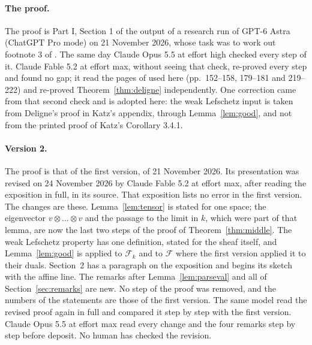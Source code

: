 \documentclass[11pt,a4paper]{article}
\theoremstyle{plain}
\theoremstyle{remark}
\newcommand{\F}{\mathcal F}
\begin{document}
\paragraph{The proof.}
The proof is Part I, Section 1 of the output of a research run of GPT-6 Astra (ChatGPT Pro mode) on 21 November 2026,
whose task was to work out footnote 3 of \cite{Alpoge}. The same day Claude Opus 5.5 at effort high checked every
step of it. Claude Fable 5.2 at effort max, without seeing that check, re-proved every step and found no gap; it read
the pages of \cite{KatzACT} used here (pp.~152--158, 179--181 and 219--222) and re-proved
Theorem~\ref{thm:deligne} independently. One correction came from that second check and is adopted here: the weak
Lefschetz input is taken from Deligne's proof in Katz's appendix, through Lemma~\ref{lem:good}, and not from the
printed proof of Katz's Corollary 3.4.1.

\paragraph{Version 2.}
The proof is that of the first version, of 21 November 2026. Its presentation was revised on 24 November 2026 by
Claude Fable 5.2 at effort max, after reading the exposition \cite{Zhang} in full, in its source. That exposition
lists no error in the first version. The changes are these. Lemma~\ref{lem:tensor} is stated for one space; the
eigenvector $v\otimes\dots\otimes v$ and the passage to the limit in $k$, which were part of that lemma, are now the
last two steps of the proof of Theorem~\ref{thm:middle}. The weak Lefschetz property has one definition, stated for
the sheaf itself, and Lemma~\ref{lem:good} is applied to $\F_k$ and to $\F$ where the first version applied it to
their duals. Section~2 has a paragraph on the exposition and begins its sketch with the affine line. The remarks
after Lemma~\ref{lem:parseval} and all of Section~\ref{sec:remarks} are new. No step of the proof was removed, and
the numbers of the statements are those of the first version. The same model read the revised proof again in full
and compared it step by step with the first version. Claude Opus 5.5 at effort max read every change and the four remarks step by step before deposit. No human has checked the revision.
\end{document}
